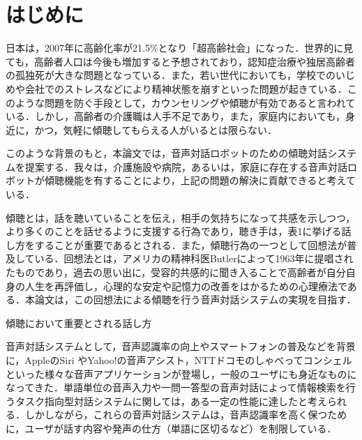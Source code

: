 \documentclass[japanese]{jnlp_1.4}
\begin{document}
\maketitle


\section{はじめに}

日本は，2007年に高齢化率が21.5\%となり「超高齢社会」になった\cite{no1}．世界的に見ても，高齢者人口は今後も増加すると予想されており，認知症治療や独居高齢者の孤独死が大きな問題となっている．また，若い世代においても，学校でのいじめや会社でのストレスなどにより精神状態を崩すといった問題が起きている．このような問題を防ぐ手段として，カウンセリングや傾聴が有効であると言われている\cite{no2}．しかし，高齢者の介護職は人手不足であり，また，家庭内においても，身近に，かつ，気軽に傾聴してもらえる人がいるとは限らない．

このような背景のもと，本論文では，音声対話ロボットのための傾聴対話システムを提案する．我々は，介護施設や病院，あるいは，家庭に存在する音声対話ロボットが傾聴機能を有することにより，上記の問題の解決に貢献できると考えている． 

傾聴とは，話を聴いていることを伝え，相手の気持ちになって共感を示しつつ，より多くのことを話せるように支援する行為であり，聴き手は，表1に挙げる話し方をすることが重要であるとされる\cite{no3,no4,no5}．また，傾聴行為の一つとして回想法が普及している．回想法とは，アメリカの精神科医Butlerによって1963年に提唱されたものであり\cite{no6}，過去の思い出に，受容的共感的に聞き入ることで高齢者が自分自身の人生を再評価し，心理的な安定や記憶力の改善をはかるための心理療法である\cite{no7}．本論文は，この回想法による傾聴を行う音声対話システムの実現を目指す．

\begin{table}[b]
\caption{傾聴において重要とされる話し方}
\label{table:1}

\end{table}

音声対話システムとして，音声認識率の向上やスマートフォンの普及などを背景に，AppleのSiri \cite{no8} やYahoo!の音声アシスト\cite{no9}，NTTドコモのしゃべってコンシェル\cite{no10}といった様々な音声アプリケーションが登場し，一般のユーザにも身近なものになってきた．単語単位の音声入力や一問一答型の音声対話によって情報検索を行うタスク指向型対話システムに関しては，ある一定の性能に達したと考えられる\cite{no11}．しかしながら，これらの音声対話システムは，音声認識率を高く保つために，ユーザが話す内容や発声の仕方（単語に区切るなど）を制限している．
\end{document}
